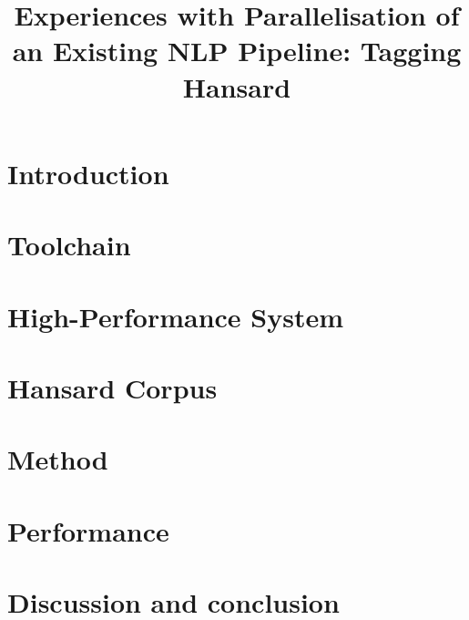 \documentclass[10pt, a4paper]{article}
\title{Experiences with Parallelisation of an Existing NLP Pipeline: Tagging Hansard}
\begin{document}
\maketitleabstract%

\section{Introduction}


\section{Toolchain}



\section{High-Performance System}



\section{Hansard Corpus}



\section{Method}



\section{Performance}




\section{Discussion and conclusion}







\end{document}
